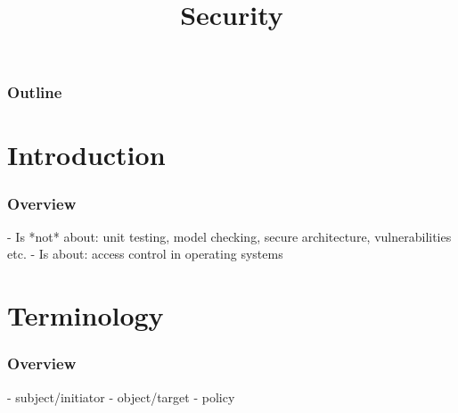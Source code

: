 %
%
%
%
%
%

%
%

%
%

\def\path{../../../..}

%
%



%
%

\title{Security}

%
%



%
%

\begin{frame}
  \titlepage
\end{frame}

%
%

\begin{frame}
  \frametitle{Outline}

  \tableofcontents
\end{frame}

%
%

\section{Introduction}


\begin{frame}
  \frametitle{Overview}

  - Is *not* about: unit testing, model checking, secure architecture, vulnerabilities etc.
  - Is about: access control in operating systems
\end{frame}

%
%

\section{Terminology}


\begin{frame}
  \frametitle{Overview}

  - subject/initiator
  - object/target
  - policy
\end{frame}

